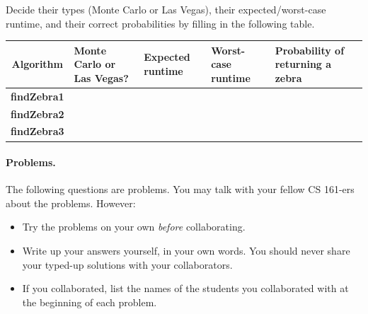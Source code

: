 \documentclass[12pt]{article}
\begin{document}
\begin{algorithm}[H]
{
}
\caption{\textsc{findZebra3}}
\end{algorithm}


    Decide their types (Monte Carlo or Las Vegas), their expected/worst-case runtime, and their correct probabilities by filling in the following table.

    \begin{center}
    \begin{tabular}{|c|p{3cm}|p{2cm}|p{2cm}|p{4cm}|}
    \hline
    Algorithm & Monte Carlo or Las Vegas? & Expected runtime 
    & Worst-case runtime & Probability of returning a zebra \\
    \hline
    \textbf{findZebra1} &  &  &  & \\
    \hline
    \textbf{findZebra2} &  &  &  & \\
    \hline
    \textbf{findZebra3} &  &  &  & \\
    \hline
    \end{tabular}
    \end{center}


	
	\vspace{1em}
	\begin{Instruction}
		\paragraph{Problems.} The following questions are problems. You may talk with your fellow CS 161-ers about the problems. However:
		\begin{itemize}
			\item Try the problems on your own \emph{before} collaborating.
			\item Write up your answers yourself, in your own words. You should never share your typed-up solutions with your collaborators.
			\item If you collaborated, list the names of the students you collaborated with at the beginning of each problem.
		\end{itemize}
	\end{Instruction}
\end{document}
